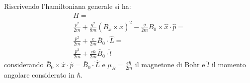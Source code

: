 Riscrivendo l'hamiltoniana generale si ha:
\begin{equation}\begin{split}
H=\\
\frac{p^2}{2m}+\frac{q^2}{8m}\left(\bar B_x\times \bar x\right)^2-\frac{q}{2m}\bar B_0\times \hat x\cdot \hat p=\\
\frac{p^2}{2m}+\frac{e}{2m}\bar B_0\cdot \hat L=\\
\frac{p^2}{2m}+\frac{e\hbar }{2m}\bar B_0\cdot \hat l
\end{split}\end{equation}
considerando $\bar B_0\times \hat x\cdot \hat p=\bar B_0\cdot \hat L$ e $\mu_B=\frac{e\hbar }{2m}$ il magnetone di Bohr e $\hat l$ il momento angolare considerato in $\hbar $.